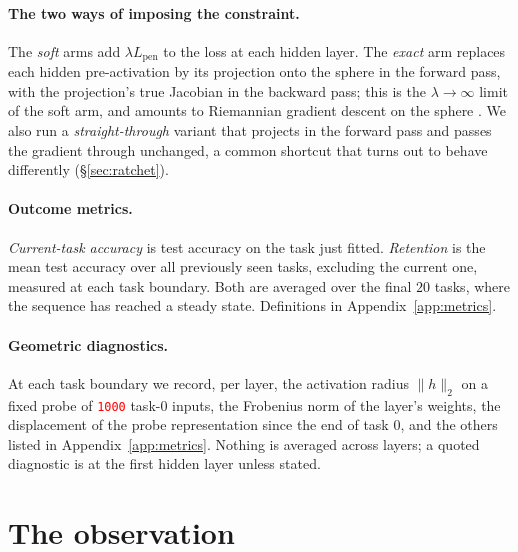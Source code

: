 \documentclass[anon]{opt2026}     %
\newcommand{\PH}[1]{\textcolor{red}{\texttt{#1}}}   %
\begin{document}
\paragraph{The two ways of imposing the constraint.} The \emph{soft} arms add
$\lambda L_{\mathrm{pen}}$ to the loss at each hidden layer. The \emph{exact}
arm replaces each hidden pre-activation by its projection onto the sphere in the
forward pass, with the projection's true Jacobian in the backward pass; this is
the $\lambda \to \infty$ limit of the soft arm, and amounts to Riemannian
gradient descent on the sphere \citep{absil2008optimization}. We also run
a \emph{straight-through} variant that projects in the forward pass and passes
the gradient through unchanged, a common shortcut that turns out to behave
differently (\S\ref{sec:ratchet}).

\paragraph{Outcome metrics.} \emph{Current-task accuracy} is test accuracy on
the task just fitted. \emph{Retention} is the mean test accuracy over all
previously seen tasks, excluding the current one, measured at each task
boundary. Both are averaged over the final $20$ tasks, where the sequence has
reached a steady state. Definitions in Appendix~\ref{app:metrics}.

\paragraph{Geometric diagnostics.} At each task boundary we record, per layer,
the activation radius $\|h\|_2$ on a fixed probe of \PH{1000} task-$0$ inputs,
the Frobenius norm of the layer's weights, the displacement of the probe
representation since the end of task $0$, and the others listed in
Appendix~\ref{app:metrics}. Nothing is averaged across layers; a quoted
diagnostic is at the first hidden layer unless stated.

\section{The observation}
\label{sec:observation}
\end{document}
